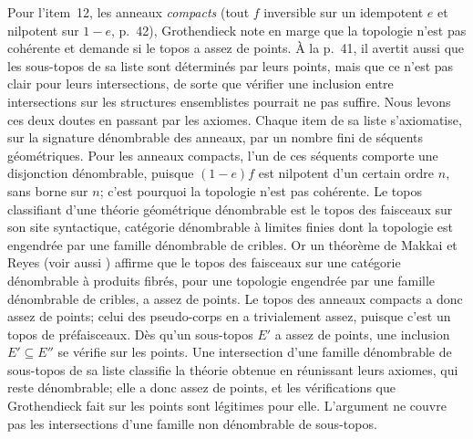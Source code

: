 Pour l'item~12, les anneaux \emph{compacts} (tout $f$ inversible sur un idempotent $e$ et nilpotent sur $1-e$, p.~42), Grothendieck note en marge que la topologie n'est pas cohérente et demande si le topos a assez de points. À la p.~41, il avertit aussi que les sous-topos de sa liste sont déterminés par leurs points, mais que ce n'est pas clair pour leurs intersections, de sorte que vérifier une inclusion entre intersections sur les structures ensemblistes pourrait ne pas suffire. Nous levons ces deux doutes en passant par les axiomes. Chaque item de sa liste s'axiomatise, sur la signature dénombrable des anneaux, par un nombre fini de séquents géométriques. Pour les anneaux compacts, l'un de ces séquents comporte une disjonction dénombrable, puisque $(1-e)f$ est nilpotent d'un certain ordre $n$, sans borne sur $n$; c'est pourquoi la topologie n'est pas cohérente. Le topos classifiant d'une théorie géométrique dénombrable est le topos des faisceaux sur son site syntactique, catégorie dénombrable à limites finies dont la topologie est engendrée par une famille dénombrable de cribles. Or un théorème de Makkai et Reyes \cite[th.~6.2.4]{makkai-reyes} (voir aussi \cite[cor.~3.3.10]{diliberti-rogers}) affirme que le topos des faisceaux sur une catégorie dénombrable à produits fibrés, pour une topologie engendrée par une famille dénombrable de cribles, a assez de points. Le topos des anneaux compacts a donc assez de points; celui des pseudo-corps en a trivialement assez, puisque c'est un topos de préfaisceaux. Dès qu'un sous-topos $E'$ a assez de points, une inclusion $E'\subseteq E''$ se vérifie sur les points. Une intersection d'une famille dénombrable de sous-topos de sa liste classifie la théorie obtenue en réunissant leurs axiomes, qui reste dénombrable; elle a donc assez de points, et les vérifications que Grothendieck fait sur les points sont légitimes pour elle. L'argument ne couvre pas les intersections d'une famille non dénombrable de sous-topos.
